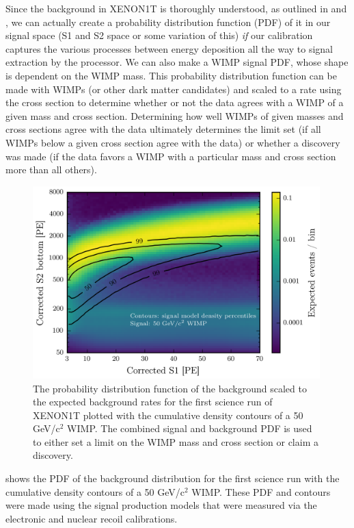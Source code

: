 Since the background in XENON1T is thoroughly understood, as outlined in  and , we can actually create a probability distribution function (PDF) of it in our signal space (S1 and S2 space or some variation of this) \textit{if} our calibration captures the various processes between energy deposition all the way to signal extraction by the processor.  We can also make a WIMP signal PDF, whose shape is dependent on the WIMP mass.  This probability distribution function can be made with WIMPs (or other dark matter candidates) and scaled to a rate using the cross section to determine whether or not the data agrees with a WIMP of a given mass and cross section.  Determining how well WIMPs of given masses and cross sections agree with the data ultimately determines the limit set (if all WIMPs below a given cross section agree with the data) or whether a discovery was made (if the data favors a WIMP with a particular mass and cross section more than all others).

\begin{figure}
        \centering
	\includegraphics[width=0.99\textwidth]{xe1t_background_pdf}
	\caption{The probability distribution function of the background scaled to the expected background rates for the first science run of XENON1T plotted with the cumulative density contours of a 50 GeV/$\textrm{c}^2$ WIMP.  The combined signal and  background PDF is used to either set a limit on the WIMP mass and cross section or claim a discovery.}
	\label{fig:xe1t_background_pdf}
\end{figure}

 shows the PDF of the background distribution for the first science run with the cumulative density contours of a 50 GeV/$\textrm{c}^2$ WIMP.  These PDF and contours were made using the signal production models that were measured via the electronic and nuclear recoil calibrations.

